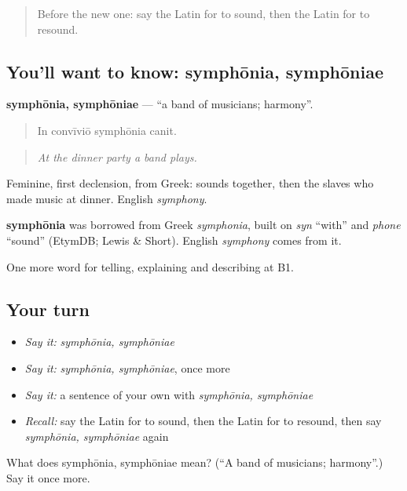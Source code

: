 \begin{quote}
Before the new one: say the Latin for to sound, then the Latin for to resound.
\end{quote}

\subsection*{You'll want to know: symphōnia, symphōniae}
\textbf{symphōnia, symphōniae} — \textquotedblleft{}a band of musicians; harmony\textquotedblright{}.

\begin{quote}
In convīviō symphōnia canit.
\end{quote}

\begin{quote}
\emph{At the dinner party a band plays.}
\end{quote}

Feminine, first declension, from Greek: sounds together, then the slaves who made music at dinner. English \emph{symphony}.

\begin{cousinweb}
\textbf{symphōnia} was borrowed from Greek \emph{symphonia}, built on \emph{syn} \textquotedblleft{}with\textquotedblright{} and \emph{phone} \textquotedblleft{}sound\textquotedblright{} (EtymDB; Lewis \& Short). English \emph{symphony} comes from it.
\end{cousinweb}

\begin{grammarlens}[title={What you've built}]
One more word for telling, explaining and describing at B1.
\end{grammarlens}

\subsection*{Your turn}
\begin{itemize}
\raggedright
  \item \emph{Say it:} \emph{symphōnia, symphōniae}
  \item \emph{Say it:} \emph{symphōnia, symphōniae}, once more
  \item \emph{Say it:} a sentence of your own with \emph{symphōnia, symphōniae}
  \item \emph{Recall:} say the Latin for to sound, then the Latin for to resound, then say \emph{symphōnia, symphōniae} again
\end{itemize}

\begin{tcolorbox}[breakable,colback=teal!4,colframe=teal!35!black,title={Before you move on}]
What does symphōnia, symphōniae mean? (\textquotedblleft{}A band of musicians; harmony\textquotedblright{}.) Say it once more.
\end{tcolorbox}
